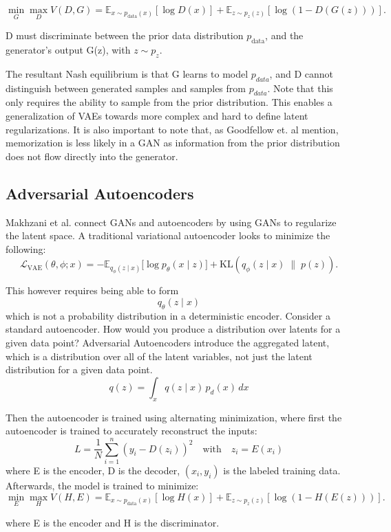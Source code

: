 \documentclass[11pt]{article}
\begin{document}
\[
\min_G \max_D V(D,G)
=
\mathbb{E}_{x \sim p_{\text{data}}(x)}
\left[\log D(x)\right]
+
\mathbb{E}_{z \sim p_z(z)}
\left[\log\left(1 - D(G(z))\right)\right].
\]

D must discriminate between the prior data distribution \(p_{\text{data}}\), and the generator's output G(z), with \(z \sim p_z\). 

The resultant Nash equilibrium is that G learns to model \(p_{data}\), and D cannot distinguish between generated samples and samples from \(p_{data}\). Note that this only requires the ability to sample from the prior distribution. This enables a generalization of VAEs towards more complex and hard to define latent regularizations. It is also important to note that, as Goodfellow et. al mention, memorization is less likely in a GAN as information from the prior distribution does not flow directly into the generator.

\subsection{Adversarial Autoencoders}
Makhzani et al. connect GANs and autoencoders by using GANs to regularize the latent space. A traditional variational autoencoder looks to minimize the following:
\[
    \mathcal{L}_{\mathrm{VAE}}(\theta,\phi;x)
    = -\mathbb{E}_{q_\phi(z\mid x)}\big[\log p_\theta(x\mid z)\big]
      + \mathrm{KL}\!\left(q_\phi(z\mid x)\;\|\;p(z)\right).
\]

This however requires being able to form \[q_\theta(z\mid x)\] which is not a probability distribution in a deterministic encoder. Consider a standard autoencoder. How would you produce a distribution over latents for a given data point? Adversarial Autoencoders introduce the aggregated latent, which is a distribution over all of the latent variables, not just the latent distribution for a given data point.
\[
q(z) = \int_x q(z \mid x)\, p_d(x)\, dx
\]

Then the autoencoder is trained using alternating minimization, where first the autoencoder is trained to accurately reconstruct the inputs:
\[
L = \frac{1}{N}\sum_{i=1}^{n} (y_i-D(z_i))^2 \quad \text{with} \quad z_i = E(x_i)
\]
where E is the encoder, D is the decoder, $(x_i, y_i)$ is the labeled training data.
Afterwards, the model is trained to minimize:
\[
\min_E \max_H V(H,E)
=
\mathbb{E}_{x \sim p_{\text{data}}(x)}
\left[\log H(x)\right]
+
\mathbb{E}_{z \sim p_z(z)}
\left[\log\left(1 - H(E(z))\right)\right].
\]

where E is the encoder and H is the discriminator.
\end{document}
